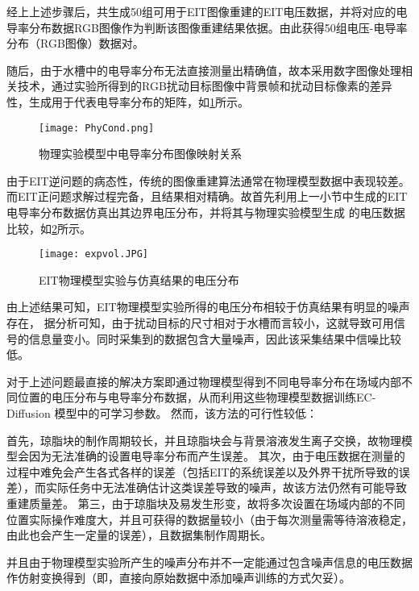 经上上述步骤后，共生成50组可用于EIT图像重建的EIT电压数据，并将对应的电导率分布数据RGB图像作为判断该图像重建结果依据。由此获得50组电压-电导率分布（RGB图像）数据对。

随后，由于水槽中的电导率分布无法直接测量出精确值，故本采用数字图像处理相关技术，通过实验所得到的RGB扰动目标图像中背景帧和扰动目标像素的差异性，生成用于代表电导率分布的矩阵，如\cref{figure:PhyCond}所示。
\begin{figure}[H]
    \centering
    \texttt{[image: PhyCond.png]}
    \caption{物理实验模型中电导率分布图像映射关系}
    \label{figure:PhyCond}
\end{figure}

\label{NoiseRob}
由于EIT逆问题的病态性，传统的图像重建算法通常在物理模型数据中表现较差。而EIT正问题求解过程完备，且结果相对精确。故首先利用上一小节中生成的EIT电导率分布数据仿真出其边界电压分布，并将其与物理实验模型生成
的电压数据比较，如\cref{figure:expvol}所示。


\begin{figure}[h]
    \centering
    \texttt{[image: expvol.JPG]}
    \caption{EIT物理模型实验与仿真结果的电压分布}
    \label{figure:expvol}
\end{figure}

由上述结果可知，EIT物理模型实验所得的电压分布相较于仿真结果有明显的噪声存在，
据分析可知，由于扰动目标的尺寸相对于水槽而言较小，这就导致可用信号的信息量变小。同时采集到的数据包含大量噪声，因此该采集结果中信噪比较低。

对于上述问题最直接的解决方案即通过物理模型得到不同电导率分布在场域内部不同位置的电压分布与电导率分布数据，从而利用这些物理模型数据训练EC-Diffusion 模型中的可学习参数。
然而，该方法的可行性较低：

首先，琼脂块的制作周期较长，并且琼脂块会与背景溶液发生离子交换，故物理模型会因为无法准确的设置电导率分布而产生误差。
其次，由于电压数据在测量的过程中难免会产生各式各样的误差（包括EIT的系统误差以及外界干扰所导致的误差），而实际任务中无法准确估计这类误差导致的噪声，故该方法仍然有可能导致重建质量差。
第三，由于琼脂块及易发生形变，故将多次设置在场域内部的不同位置实际操作难度大，并且可获得的数据量较小（由于每次测量需等待溶液稳定，由此也会产生一定量的误差），且数据集制作周期长。

并且由于物理模型实验所产生的噪声分布并不一定能通过包含噪声信息的电压数据作仿射变换得到（即，直接向原始数据中添加噪声训练的方式欠妥）。

